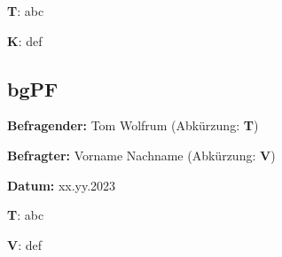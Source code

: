 \begin{list}{X:}{\setlength{\labelsep}{5mm}}
    \linenumbers[1]
    \item[\textbf{T}:] abc
    \item[\textbf{K}:] def 
\end{list}

\subsection{bgPF} \label{T_bgPF}

\textbf{Befragender:} Tom Wolfrum (Abkürzung: \textbf{T})

\textbf{Befragter:} Vorname Nachname (Abkürzung: \textbf{V})

\textbf{Datum:} xx.yy.2023

\begin{list}{X:}{\setlength{\labelsep}{5mm}}
    \linenumbers[1]
    \item[\textbf{T}:] abc
    \item[\textbf{V}:] def 
\end{list}
